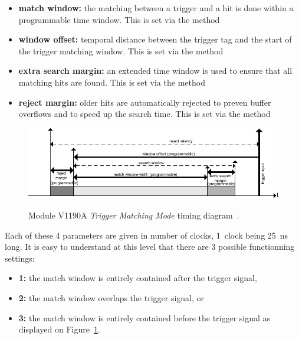 	\begin{itemize}
		\item \textbf{match window:} the matching between a trigger and a hit is done within a programmable time window. This is set via the method\\ 
		\item \textbf{window offset:} temporal distance between the trigger tag and the start of the trigger matching window. This is set via the method\\ 
		\item \textbf{extra search margin:} an extended time window is used to ensure that all matching hits are found. This is set via the method\\ 
		\item \textbf{reject margin:} older hits are automatically rejected to preven buffer overflows and to speed up the search time. This is set via the method\\ 
	\end{itemize}
    
    \begin{figure}[H]
		\centering
		\includegraphics[width = 1.25\plotwidth]{fig/app1/V1190A-TMM.pdf}\\
		\caption{\label{fig:V1190A-TMM} Module V1190A \textit{Trigger Matching Mode} timing diagram~\cite{V1190AMUT}.}
	\end{figure}
	
	Each of these 4 parameters are given in number of clocks, \SI{1}{clock} being \SI{25}{ns} long. It is easy to understand at this level that there are 3 possible functionning settings:
        
	\begin{itemize}
		\item \textbf{1:} the match window is entirely contained after the trigger signal,
		\item \textbf{2:} the match window overlaps the trigger signal, or
		\item \textbf{3:} the match window is entirely contained before the trigger signal as displayed on Figure~\ref{fig:V1190A-TMM}.
	\end{itemize}
	
